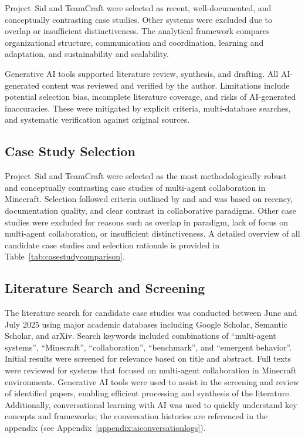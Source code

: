 \documentclass[a4paper, 12pt]{article}
\begin{document}
Project~Sid and TeamCraft were selected as recent, well-documented, and conceptually contrasting case studies. Other systems were excluded due to overlap or insufficient distinctiveness. The analytical framework compares organizational structure, communication and coordination, learning and adaptation, and sustainability and scalability.

Generative AI tools supported literature review, synthesis, and drafting. All AI-generated content was reviewed and verified by the author. Limitations include potential selection bias, incomplete literature coverage, and risks of AI-generated inaccuracies. These were mitigated by explicit criteria, multi-database searches, and systematic verification against original sources.

\subsection{Case Study Selection}

Project~Sid and TeamCraft were selected as the most methodologically robust and conceptually contrasting case studies of multi-agent collaboration in Minecraft. Selection followed criteria outlined by \textcite{Yin2018} and \textcite{Eisenhardt1989} and was based on recency, documentation quality, and clear contrast in collaborative paradigms. Other case studies were excluded for reasons such as overlap in paradigm, lack of focus on multi-agent collaboration, or insufficient distinctiveness. A detailed overview of all candidate case studies and selection rationale is provided in Table~\ref{tab:casestudycomparison}.

\subsection{Literature Search and Screening}

The literature search for candidate case studies was conducted between June and July 2025 using major academic databases including Google Scholar, Semantic Scholar, and arXiv. Search keywords included combinations of ``multi-agent systems'', ``Minecraft'', ``collaboration'', ``benchmark'', and ``emergent behavior''. Initial results were screened for relevance based on title and abstract. Full texts were reviewed for systems that focused on multi-agent collaboration in Minecraft environments. Generative AI tools were used to assist in the screening and review of identified papers, enabling efficient processing and synthesis of the literature. Additionally, conversational learning with AI was used to quickly understand key concepts and frameworks; the conversation histories are referenced in the appendix (see Appendix~\ref{appendix:aiconversationlogs}).
\end{document}
